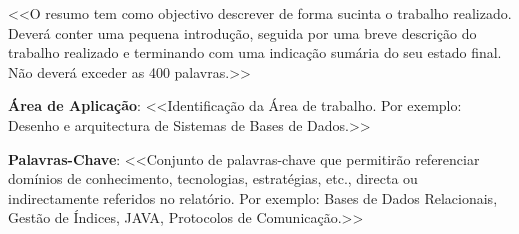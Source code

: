 \documentclass[a4paper,12pt]{scrreprt}
\begin{document}

\makecover





\renewenvironment{abstract}
 {\par\noindent\textbf{\Large\abstractname}\par\bigskip}
 {}

\begin{flushleft}
\begin{abstract}
    <<O resumo tem como objectivo descrever de forma sucinta o trabalho realizado. Deverá conter uma pequena introdução, seguida por uma breve descrição do trabalho realizado e terminando com uma indicação sumária do seu estado final. Não deverá exceder as 400 palavras.>> 
    \par \textbf{Área de Aplicação}: <<Identificação da Área de trabalho. Por exemplo: Desenho e arquitectura de Sistemas de Bases de Dados.>> 
    \par \textbf{Palavras-Chave}: <<Conjunto de palavras-chave que permitirão referenciar domínios de conhecimento, tecnologias, estratégias, etc., directa ou indirectamente referidos no relatório. Por exemplo: Bases de Dados Relacionais, Gestão de Índices, JAVA, Protocolos de Comunicação.>>
\end{abstract}
\end{flushleft}


\pagebreak



\renewcommand{\contentsname}{Índice}

\tableofcontents
\end{document}
